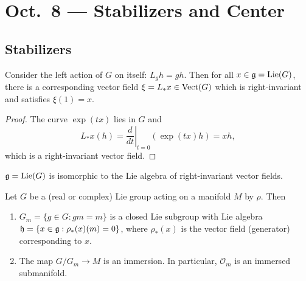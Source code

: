 \chapter{Oct.~8 --- Stabilizers and Center}

\section{Stabilizers}

\begin{prop}
  Consider the left action of $G$
  on itself: $L_g h = gh$. Then for
  all $x \in \mathfrak{g} = \operatorname{Lie}(G)$, there is a
  corresponding vector field
  $\xi = L_* x \in \operatorname{Vect}(G)$
  which
  is right-invariant
  and satisfies $\xi(1) = x$.
\end{prop}

\begin{proof}
  The curve $\exp(tx)$ lies in
  $G$ and
  \[
    L_* x(h)
    = \left.\frac{d}{dt}\right|_{t = 0}
      (\exp(tx) h)
    = x h,
  \]
  which is a right-invariant vector
  field.
\end{proof}

\begin{corollary}
  $\mathfrak{g} = \operatorname{Lie}(G)$ is isomorphic to
  the Lie algebra of right-invariant
  vector fields.
\end{corollary}

\begin{theorem}\label{thm:stabilizer}
  Let $G$ be a (real or complex)
  Lie group acting on a manifold $M$
  by $\rho$.
  Then
  \begin{enumerate}
    \item $G_m = \{g \in G : gm = m\}$
      is a closed Lie subgroup
      with Lie algebra
      $\mathfrak{h} = \{x \in \mathfrak{g} : \rho_*(x)(m) = 0\}$,
      where $\rho_*(x)$ is the
      vector field (generator)
      corresponding to $x$.
    \item The map $G / G_m \to M$
      is an immersion. In particular,
      $\mathcal{O}_m$ is an immersed submanifold.
  \end{enumerate}
\end{theorem}

